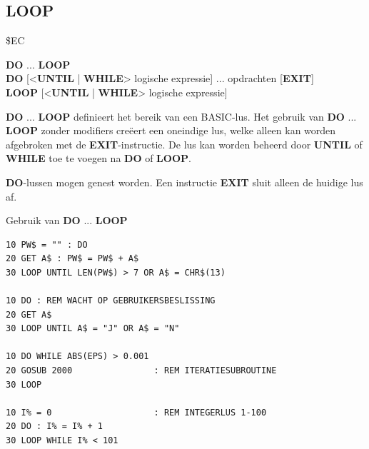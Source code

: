 
\newpage
\subsection{LOOP}
\begin{description}[leftmargin=2cm,style=nextline]
\item [Token:]    \$EC

\item [Formaat:]   {\bf DO} ... {\bf LOOP} \\                {\bf DO} [<{\bf UNTIL} | {\bf WHILE}> logische expressie] ... opdrachten [{\bf EXIT}] \\                  {\bf LOOP} [<{\bf UNTIL} | {\bf WHILE}> logische expressie]

\item [Gebruik:]    {\bf DO} ... {\bf LOOP} definieert het bereik van een BASIC-lus. Het gebruik van {\bf DO} ... {\bf LOOP} zonder modifiers creëert een oneindige lus, welke alleen kan worden afgebroken met de {\bf EXIT}-instructie. De lus kan worden beheerd door {\bf UNTIL} of {\bf WHILE} toe te voegen na {\bf DO} of {\bf LOOP}.

\item [Opmerkingen:]  {\bf DO}-lussen mogen genest worden. Een instructie {\bf EXIT} sluit alleen de huidige lus af.

\item [Voorbeelden:] Gebruik van {\bf DO} ... {\bf LOOP}

\begin{tcolorbox}[colback=black,coltext=white]
\verbatimfont{\codefont}
\begin{verbatim}
10 PW$ = "" : DO
20 GET A$ : PW$ = PW$ + A$
30 LOOP UNTIL LEN(PW$) > 7 OR A$ = CHR$(13)

10 DO : REM WACHT OP GEBRUIKERSBESLISSING
20 GET A$
30 LOOP UNTIL A$ = "J" OR A$ = "N"

10 DO WHILE ABS(EPS) > 0.001
20 GOSUB 2000                : REM ITERATIESUBROUTINE
30 LOOP

10 I% = 0                    : REM INTEGERLUS 1-100
20 DO : I% = I% + 1
30 LOOP WHILE I% < 101
\end{verbatim}
\end{tcolorbox}
\end{description}


\newpage
